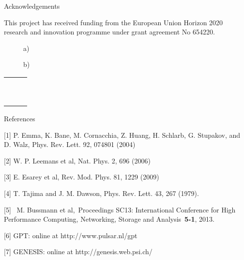 \documentclass{article}
\begin{document}
\bigskip


\bigskip

Acknowledgements

This project has received funding from the European Union Horizon 2020 research
and innovation programme under grant agreement No 654220.\ \ 

\begin{figure}
\centering
\begin{minipage}{0.3827in}
a)
\end{minipage}
\end{figure}
\begin{figure}
\centering
\begin{minipage}{0.3827in}
b)
\end{minipage}
\end{figure}
\begin{flushleft}
\tablefirsthead{}
\tablehead{}
\tabletail{}
\tablelasttail{}
\begin{supertabular}{ll}
~
 & ~
\\
\\
\end{supertabular}
\end{flushleft}

\bigskip


\bigskip


\bigskip

References 

[1] P. Emma, K. Bane, M. Cornacchia, Z. Huang, H. Schlarb, G. Stupakov, and D.
Walz, Phys. Rev. Lett. 92, 074801 (2004)

[2] W. P. Leemans et al, Nat. Phys. 2, 696 (2006)

[3] E. Esarey et al, Rev. Mod. Phys. 81, 1229 (2009)

[4] T. Tajima and J. M. Dawson, Phys. Rev. Lett. 43, 267 (1979).

[5] ~M. Bussmann et al,~Proceedings SC13: International Conference for High
Performance Computing, Networking, Storage and Analysis~\textbf{5-1}, 2013.

[6] GPT: online at http://www.pulsar.nl/gpt

[7] GENESIS: online at http://genesis.web.psi.ch/
\end{document}
